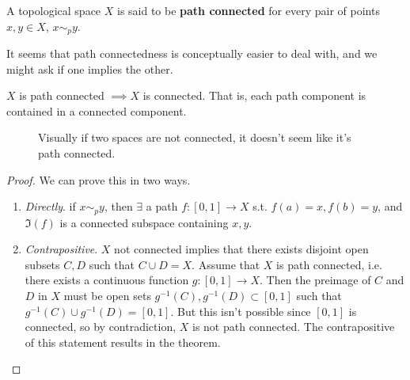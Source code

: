   \begin{definition} 
     A topological space $X$ is said to be \textbf{path connected} for every pair of points $x, y \in X$, $x \sim_p y$. 
  \end{definition}

  It seems that path connectedness is conceptually easier to deal with, and we might ask if one implies the other. 

  \begin{theorem}
    $X$ is path connected $\implies X$ is connected. That is, each path component is contained in a connected component. 

    \begin{figure}[H]
      \centering 
      \caption{Visually if two spaces are not connected, it doesn't seem like it's path connected. }
      \label{fig:path_vs_reg_connectedness}
    \end{figure}
  \end{theorem}
  \begin{proof} 
    We can prove this in two ways. 
    \begin{enumerate}
      \item \textit{Directly}. if $x \sim_p y$, then $\exists$ a path $f: [0, 1] \rightarrow X$ s.t. $f(a) = x, f(b) = y$, and $\Im(f)$ is a connected subspace containing $x, y$. 

      \item \textit{Contrapositive}. $X$ not connected implies that there exists disjoint open subsets $C, D$ such that $C \cup D = X$. Assume that $X$ is path connected, i.e. there exists a continuous function $g: [0,1] \longrightarrow X$. Then the preimage of $C$ and $D$ in $X$ must be open sets $g^{-1} (C), g^{-1} (D) \subset [0,1]$ such that $g^{-1}(C) \cup g^{-1}(D) = [0,1]$. But this isn't possible since $[0,1]$ is connected, so by contradiction, $X$ is not path connected. The contrapositive of this statement results in the theorem. 
    \end{enumerate}
  \end{proof} 

